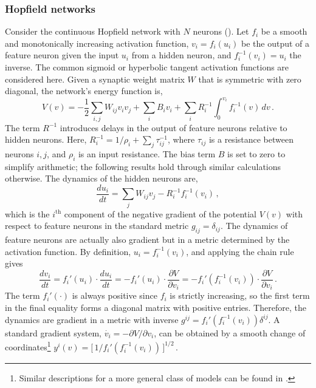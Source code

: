 \documentclass[12pt]{article}
\begin{document}
\subsubsection{Hopfield networks}
\label{subsubsection:hopfield-networks}
Consider the continuous Hopfield network with $N$ neurons (\cite{hopfield1984neurons}). Let $f_i$ be a smooth and monotonically increasing activation function, $v_i = f_i(u_i)$ be the output of a feature neuron given the input $u_i$ from a hidden neuron, and $f_i^{-1}(v_i) = u_i$ the inverse. The common sigmoid or hyperbolic tangent activation functions are considered here. Given a synaptic weight matrix $W$ that is symmetric with zero diagonal, the network's energy function is,
\begin{equation}
\label{equation:Hopfield-energy}
    V(v) = -\frac{1}{2} \sum_{i,j} W_{ij} v_i v_j + \sum_{i} B_i v_{i} + \sum_{i} R^{-1}_{i} \int_{0}^{v_{i}} f_{i}^{-1} (v) \,dv \,.
\end{equation}    
The term $R^{-1}$ introduces delays in the output of feature neurons relative to hidden neurons. Here, $R^{-1}_i = 1/\rho_i + \sum_j \tau^{-1}_{ij}$, where $\tau_{ij}$ is a resistance between neurons $i,j$, and $\rho_i$ is an input resistance. The bias term $B$ is set to zero to simplify arithmetic; the following results hold through similar calculations otherwise. The dynamics of the hidden neurons are,
\begin{equation*}
 {\frac{d{u_i}}{dt}} = \sum_{j} W_{ij} v_j  - R^{-1}_{i} f_i^{-1}(v_i) \, ,
\end{equation*}
which is the $i^\text{th}$ component of the negative gradient of the potential $V(v)$ with respect to feature neurons in the standard metric $g_{ij} = \delta_{ij}$. The dynamics of feature neurons are actually also gradient but in a metric determined by the activation function. By definition, $u_i = f_i^{-1}(v_i)$, and applying the chain rule gives
\begin{equation*}
    {\frac{d{v_i}}{dt}} = f_i'\left(u_i \right)\cdot \frac{du_i}{dt} = -f_i'\left(u_i \right) \cdot \frac{\partial V}{\partial v_i} = -f_i'\left(f_i^{-1}(v_i) \right) \cdot \frac{\partial V}{\partial v_i} \,.
\end{equation*}    
\noindent
The term $f_i'(\cdot)$ is always positive since $f_i$ is strictly increasing, so the first term in the final equality forms a diagonal matrix with positive entries. Therefore, the dynamics are gradient in a metric with inverse $g^{ij} = f_i'\left(f_i^{-1}(v_i) \right) \delta^{ij}$. A standard gradient system, ${\dot{v_i} = -\partial V/\partial v_i}$, can be obtained by a smooth change of coordinates\footnote{Similar descriptions for a more general class of models can be found in \cite{cohen1983absolute}.} ${y^i(v) = [\,{1}/{f_i'\left(f_i^{-1}(v_i)\right)}}\,]^{1/2} \,$.
\end{document}
